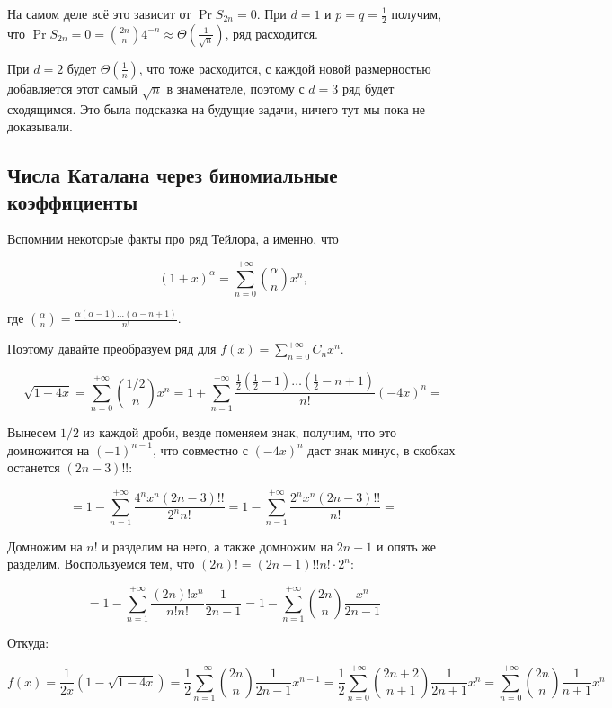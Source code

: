 На самом деле всё это зависит от $\Pr{S_{2n} = 0}$. При $d = 1$ и $p = q = \frac{1}{2}$
получим, что $\Pr{S_{2n} = 0} = \binom{2n}{n}4^{-n} \approx \Theta\left(\frac{1}{\sqrt{n}}\right)$, ряд расходится.

При $d = 2$ будет $\Theta\left(\frac{1}{n}\right)$, что тоже расходится, с каждой
новой размерностью добавляется этот самый $\sqrt{n}$ в знаменателе, поэтому
с $d = 3$ ряд будет сходящимся. Это была подсказка на будущие задачи, ничего
тут мы пока не доказывали.

\subsection{Числа Каталана через биномиальные коэффициенты}
Вспомним некоторые факты про ряд Тейлора, а именно, что

\[
  (1 + x)^{\alpha} = \sum\limits_{n = 0}^{+\infty} \binom{\alpha}{n}x^n,
\]

где $\binom{\alpha}{n} = \frac{\alpha(\alpha - 1)\ldots (\alpha - n + 1)}{n!}$.

Поэтому давайте преобразуем ряд для $f(x) = \sum\limits_{n = 0}^{+\infty} C_n x^n$.

\[
  \sqrt{1 - 4x} = \sum\limits_{n = 0}^{+\infty} \binom{1/2}{n}x^n = 
  1 + \sum\limits_{n = 1}^{+\infty} \frac{\frac{1}{2}\left(\frac{1}{2} - 1\right)
  \ldots\left(\frac{1}{2} - n + 1\right)}{n!}(-4x)^n = 
\]

Вынесем $1/2$ из каждой дроби, везде поменяем знак, получим, что это домножится
на $(-1)^{n - 1}$, что совместно с $(-4x)^n$ даст знак минус, в скобках
останется $(2n - 3)!!$:

\[
  = 1 - \sum\limits_{n = 1}^{+\infty} \frac{4^n x^n (2n - 3)!!}{2^n n!} =
  1 - \sum\limits_{n = 1}^{+\infty} \frac{2^n x^n (2n - 3)!!}{n!} = 
\]

Домножим на $n!$ и разделим на него, а также домножим на $2n - 1$ и опять же
разделим. Воспользуемся тем, что $(2n)! = (2n - 1)!! n! \cdot 2^n$:

\[
  = 1 - \sum\limits_{n = 1}^{+\infty} \frac{(2n)!x^n}{n!n!}\frac{1}{2n - 1} =
  1 - \sum\limits_{n = 1}^{+\infty} \binom{2n}{n} \frac{x^n}{2n - 1}
\]

Откуда:

\[
  f(x) = \frac{1}{2x}(1 - \sqrt{1 - 4x}) = \frac{1}{2}\sum\limits_{n = 1}^{+\infty}
  \binom{2n}{n} \frac{1}{2n - 1}x^{n - 1} = 
  \frac{1}{2}\sum\limits_{n = 0}^{+\infty} \binom{2n + 2}{n + 1} \frac{1}{2n + 1}x^{n} =
  \sum\limits_{n = 0}^{+\infty} \binom{2n}{n} \frac{1}{n + 1}x^{n}
\]

